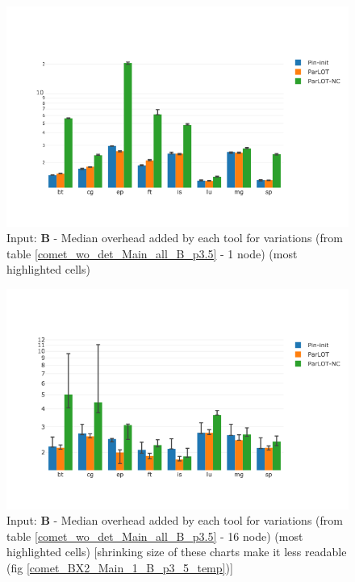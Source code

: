 \begin{figure}[!t]
\centering
\includegraphics[width=8in]{figs.comet.newMed/comet_BX2_Main_1_B_p3_5.png}
\caption{ Input: \textbf{B} - Median overhead added by each tool for \parlotm variations (from table \ref{comet_wo_det_Main_all_B_p3.5} - 1 node) (most highlighted cells)
}
\label{comet_BX2_Main_1_B_p3_5}
\end{figure}




\begin{figure}[!t]
\centering
\includegraphics[width=8in]{figs.comet.newMed/comet_BX2_Main_16_B_p3_5.png}
\caption{ Input: \textbf{B} - Median overhead added by each tool for \parlotm variations (from table \ref{comet_wo_det_Main_all_B_p3.5} - 16 node) (most highlighted cells) [shrinking size of these charts make it less readable (fig \ref{comet_BX2_Main_1_B_p3_5_temp})]
}
\label{comet_BX2_Main_16_B_p3_5}
\end{figure}



